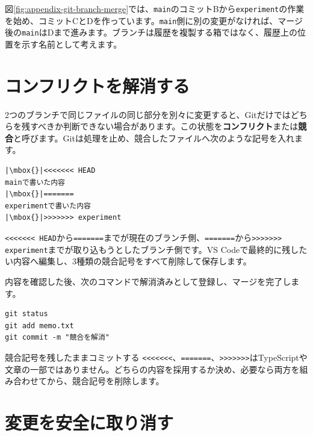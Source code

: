 図\ref{fig:appendix-git-branch-merge}では、\texttt{main}のコミットBから\texttt{experiment}の作業を始め、コミットCとDを作っています。\texttt{main}側に別の変更がなければ、マージ後の\texttt{main}はDまで進みます。ブランチは履歴を複製する箱ではなく、履歴上の位置を示す名前として考えます。

\section{コンフリクトを解消する}

2つのブランチで同じファイルの同じ部分を別々に変更すると、Gitだけではどちらを残すべきか判断できない場合があります。この状態を\textbf{コンフリクト}または\textbf{競合}と呼びます。Gitは処理を止め、競合したファイルへ次のような記号を入れます。

\begin{listing}[htbp]
\begin{verbatim}
|\mbox{}|<<<<<<< HEAD
mainで書いた内容
|\mbox{}|=======
experimentで書いた内容
|\mbox{}|>>>>>>> experiment
\end{verbatim}
\caption{コンフリクトが起きたファイルに現れる記号}
\label{lst:appendix-git-conflict-markers}
\end{listing}

\texttt{<<<<<<< HEAD}から\texttt{=======}までが現在のブランチ側、\texttt{=======}から\texttt{>>>>>>> experiment}までが取り込もうとしたブランチ側です。VS Codeで最終的に残したい内容へ編集し、3種類の競合記号をすべて削除して保存します。

内容を確認した後、次のコマンドで解消済みとして登録し、マージを完了します。

\begin{listing}[htbp]
\begin{verbatim}
git status
git add memo.txt
git commit -m "競合を解消"
\end{verbatim}
\caption{コンフリクトを解消してマージを完了するコマンド}
\label{lst:appendix-git-resolve-conflict}
\end{listing}

\begin{mistakebox}{競合記号を残したままコミットする}
\texttt{<<<<<<<}、\texttt{=======}、\texttt{>>>>>>>}はTypeScriptや文章の一部ではありません。どちらの内容を採用するか決め、必要なら両方を組み合わせてから、競合記号を削除します。
\end{mistakebox}

\section{変更を安全に取り消す}

